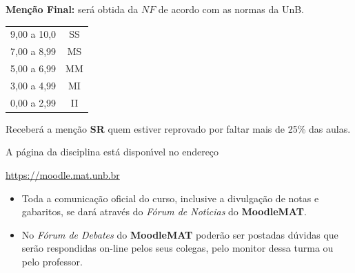\documentclass[12pt]{exam}
\begin{document}
\vspace{0.5cm}
{\bf \noindent Men\c{c}\~{a}o Final:} ser\'{a} obtida da $NF$ de
acordo com as normas da UnB.
\begin{center}
    \begin{tabular}{c|c}
        \hline\hline
        \hspace{1cm}{Nota}\hspace{1cm} & \hspace{0.25cm}{Men\c{c}\~{a}o}\hspace{0.25cm}\\
        \hline\hline
        9,00 a 10,0 & SS \\
        \hline
        7,00 a 8,99 & MS \\
        \hline
        5,00 a 6,99 & MM \\
        \hline
        3,00 a 4,99 & MI \\
        \hline
        0,00 a 2,99  & II \\
        \hline\hline
    \end{tabular}
\end{center}
Receber{\'a} a men{\c c}{\~a}o {\bf SR} quem estiver reprovado por faltar mais de 25\%
das aulas.

\vspace{0.5cm}
 A p\'agina da disciplina est\'a dispon{\'\i}vel no endere\c{c}o
\begin{center}
    \href{https://moodle.mat.unb.br/course/view.php?id=55}{https://moodle.mat.unb.br}
\end{center}


\begin{itemize}
\item Toda a comunica\c{c}\~{a}o oficial do curso, inclusive a divulga\c{c}\~{a}o de
notas e gabaritos, se dar\'{a} atrav\'{e}s do {\em F\'{o}rum de Not\'{\i}cias} do
\textbf{MoodleMAT}.
\item No {\em F\'{o}rum de Debates} do \textbf{MoodleMAT} poder\~{a}o ser
postadas d\'{u}vidas que ser\~{a}o respondidas on-line pelos seus
colegas, pelo monitor dessa turma ou pelo professor.
\end{itemize}

\end{document}

